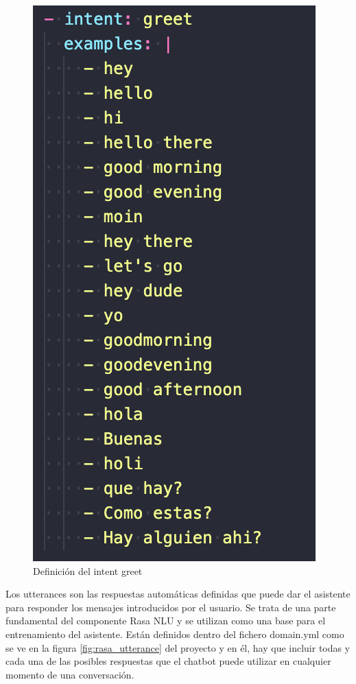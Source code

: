 \begin{figure}[H]
    \centering
    \includegraphics[scale=0.6]{include/capturas/RasaIntent.png}
    \caption{Definición del intent greet}
    \label{fig:rasa_intent}
\end{figure}


Los utterances son las respuestas automáticas definidas que puede dar el asistente para responder los mensajes introducidos por el usuario. Se trata de una parte fundamental del componente Rasa NLU y se utilizan como una base para el entrenamiento del asistente. Están definidos dentro del fichero domain.yml como se ve en la figura \ref{fig:rasa_utterance} del proyecto y en él, hay que incluir todas y cada una de las posibles respuestas que el chatbot puede utilizar en cualquier momento de una conversación.

